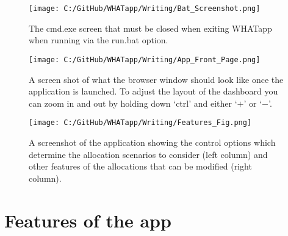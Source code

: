 \documentclass[11pt]{article}
\begin{document}
 \begin{figure} [h]
  \centering
\texttt{[image: C:/GitHub/WHATapp/Writing/Bat\_Screenshot.png]}
  \caption {The cmd.exe screen that must be closed when exiting WHATapp when running via the run.bat option.}
  \label{fig:batscreen}
\end{figure}


 \begin{figure} [h]
  \centering
\texttt{[image: C:/GitHub/WHATapp/Writing/App\_Front\_Page.png]}
  \caption {A screen shot of what the browser window should look like once the application is launched. To adjust the layout of the dashboard you can zoom in and out by holding down `ctrl' and either `$+$' or `$-$'.}
  \label{fig:frontpg}
\end{figure}


 \begin{figure} [h]
  \centering
\texttt{[image: C:/GitHub/WHATapp/Writing/Features\_Fig.png]}
  \caption {A screenshot of the application showing the control options which determine the allocation scenarios to consider (left column) and other features of the allocations that can be modified (right column).}
  \label{fig:featpg}
\end{figure}


\section{Features of the app} \label{sec:features}
\end{document}
